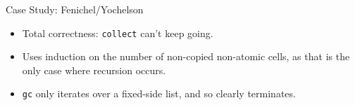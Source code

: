 \documentclass[usenames,dvipsnames]{beamer}
\begin{document}
\begin{frame}[fragile]{Case Study: Fenichel/Yochelson}
  \begin{itemize}
  \item Total correctness: \texttt{collect} can't keep going.
  \item Uses induction on the number of non-copied non-atomic cells,
    as that is the only case where recursion occurs.
  \item \texttt{gc} only iterates over a fixed-side list, and so
    clearly terminates.
  \end{itemize}

\end{frame}
\end{document}
